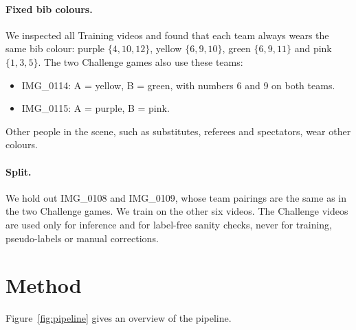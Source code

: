 \documentclass[11pt,a4paper]{article}
\begin{document}
\paragraph{Fixed bib colours.}
We inspected all Training videos and found that each team always wears the same bib colour:
purple $\{4,10,12\}$, yellow $\{6,9,10\}$, green $\{6,9,11\}$ and pink $\{1,3,5\}$. The two Challenge
games also use these teams:
\begin{itemize}
\item IMG\_0114: A = yellow, B = green, with numbers 6 and 9 on both teams.
\item IMG\_0115: A = purple, B = pink.
\end{itemize}
Other people in the scene, such as substitutes, referees and spectators, wear other colours.

\paragraph{Split.}
We hold out IMG\_0108 and IMG\_0109, whose team pairings are the same as in the two Challenge games.
We train on the other six videos. The Challenge videos are used only for inference and for label-free
sanity checks, never for training, pseudo-labels or manual corrections.

\section{Method}
Figure~\ref{fig:pipeline} gives an overview of the pipeline.
\end{document}
